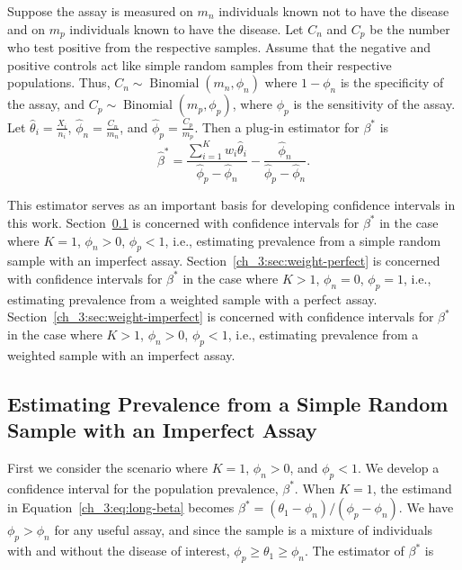 Suppose the assay is measured on \( m_n \) individuals known not to have the disease and on \( m_p \) individuals known to have the disease.
Let \( C_n \) and \( C_p \) be the number who test positive from the respective samples.
Assume that the negative and positive controls act like simple random samples from their respective populations.
Thus, \( C_n \sim \operatorname{Binomial}(m_n, \phi_n) \) where \( 1 - \phi_n \) is the specificity of the assay, and \( C_p \sim \operatorname{Binomial}(m_p, \phi_p) \), where \( \phi_p \) is the sensitivity of the assay.
Let \( \hat{\theta}_i = \frac{X_i}{n_i} \), \( \hat{\phi}_n = \frac{C_n}{m_n} \), and \( \hat{\phi}_p = \frac{C_p}{m_p} \).
Then a plug-in estimator for \( \beta^* \) is
\begin{equation}
    \hat{\beta}^* = \frac{\sum_{i=1}^K w_i \hat{\theta}_i}{\hat{\phi}_p - \hat{\phi}_n} - \frac{\hat{\phi}_n}{\hat{\phi}_p - \hat{\phi}_n}. \label{ch_3:eq:betastarhat}
\end{equation}

This estimator serves as an important basis for developing confidence intervals in this work.
Section~\ref{ch_3:sec:srs-imperfect} is concerned with confidence intervals for \( \beta^* \) in the case where \( K = 1 \), \( \phi_n > 0 \), \( \phi_p < 1 \), i.e., estimating prevalence from a simple random sample with an imperfect assay.
Section~\ref{ch_3:sec:weight-perfect} is concerned with confidence intervals for \( \beta^* \) in the case where \( K > 1 \), \( \phi_n = 0 \), \( \phi_p = 1 \), i.e., estimating prevalence from a weighted sample with a perfect assay.
Section~\ref{ch_3:sec:weight-imperfect} is concerned with confidence intervals for \( \beta^* \) in the case where \( K > 1 \), \( \phi_n > 0 \), \( \phi_p < 1 \), i.e., estimating prevalence from a weighted sample with an imperfect assay.

\subsection{Estimating Prevalence from a Simple Random Sample with an Imperfect Assay}
\label{ch_3:sec:srs-imperfect}

First we consider the scenario where \( K = 1 \), \( \phi_n > 0 \), and \( \phi_p < 1 \).
We develop a confidence interval for the population prevalence, \( \beta^* \).
When \( K = 1 \), the estimand in Equation~\ref{ch_3:eq:long-beta} becomes $\beta^* = (\theta_1 - \phi_n)/(\phi_p-\phi_n)$. We have $\phi_p > \phi_n$ for any useful assay, and since the sample is a mixture of individuals with and without the disease of interest, $\phi_p \geq \theta_1 \geq \phi_n$. The estimator of $\beta^*$ is

